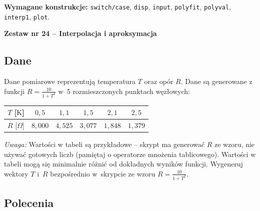 \documentclass[a4paper,11pt]{article}
\begin{document}
\vspace{0.3cm}
\begin{ramka}
\textbf{Wymagane konstrukcje:}
\texttt{switch/case}, \texttt{disp}, \texttt{input}, \texttt{polyfit}, \texttt{polyval}, \texttt{interp1}, \texttt{plot}.
\end{ramka}

\clearpage
\begin{center}
  {\large\bfseries Zestaw nr 24 \quad -- \quad Interpolacja i aproksymacja}
\end{center}
\hrulefill
\vspace{0.4cm}

\subsection*{Dane}

Dane pomiarowe reprezentują temperatura $T$ oraz opór $R$.
Dane są generowane z funkcji $R = \frac{10}{1 + T^2}$ w~5 rozmieszczonych punktach węzłowych:

\begin{center}
\begin{tabular}{c|ccccc}
  \toprule
  $T$ [$\text{K}$] & $0{,}5$ & $1{,}1$ & $1{,}5$ & $2{,}1$ & $2{,}5$ \\
  \midrule
  $R$ [$\Omega$] & $8{,}000$ & $4{,}525$ & $3{,}077$ & $1{,}848$ & $1{,}379$ \\
  \bottomrule
\end{tabular}
\end{center}

\medskip
\textit{Uwaga:} Wartości w tabeli są przykładowe – skrypt ma generować $R$ ze wzoru, nie używać gotowych liczb (pamiętaj o operatorze mnożenia tablicowego). Wartości w tabeli mogą się minimalnie różnić od dokładnych wyników funkcji.
Wygeneruj wektory $T$ i~$R$ bezpośrednio w~skrypcie ze wzoru $R = \frac{10}{1 + T^2}$.

\subsection*{Polecenia}
\end{document}
